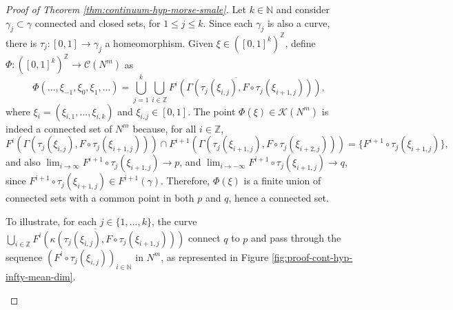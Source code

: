 \documentclass[sn-mathphys-num]{sn-jnl}%
\theoremstyle{thmstyleone}%
\theoremstyle{thmstyletwo}%
\theoremstyle{thmstylethree}%
\newcommand*\hyp[1]{\mathcal{#1}}
\begin{document}
\begin{proof}[Proof of Theorem \emph{\ref{thm:continuum-hyp-morse-smale}}]
    Let $k \in \mathbb{N}$ and consider $\gamma_j \subset \gamma$ connected and closed sets, for $1 \leq j \leq k$. Since each $\gamma_j$ is also a curve, there is $\tau_j: [0, 1] \to \gamma_j$ a homeomorphism. Given $\xi \in ([0, 1]^k)^{\mathbb{Z}}$, define $\Phi: ([0, 1]^k)^{\mathbb{Z}} \to \hyp{C}(N^m)$ as 
    \begin{equation*}
        \Phi(..., \xi_{-1}, \xi_0, \xi_1, ...) = \bigcup\limits_{j = 1}^k \overline{ \bigcup\limits_{i \in \mathbb{Z}}  F^i(\Gamma(\tau_j(\xi_{i, j}), F\circ\tau_j(\xi_{i + 1, j})))},
    \end{equation*}
    where $\xi_i = (\xi_{i, 1}, ..., \xi_{i, k})$ and $\xi_{i, j} \in [0, 1]$. The point $\Phi(\xi) \in \hyp{K}(N^m)$ is indeed a connected set of $N^m$ because, for all $i \in \mathbb{Z}$, 
    \begin{equation*}
        F^i(\Gamma(\tau_j(\xi_{i, j}), F\circ\tau_j(\xi_{i + 1, j}))) \cap F^{i + 1}(\Gamma(\tau_j(\xi_{i + 1, j}), F\circ\tau_j(\xi_{i + 2, j}))) = \{F^{i + 1}\circ\tau_j(\xi_{i + 1, j})\},
    \end{equation*}
    and also $\lim_{i \to \infty} F^{i + 1}\circ\tau_j(\xi_{i + 1, j}) \to p$, and $\lim_{i \to -\infty} F^{i + 1}\circ\tau_j(\xi_{i + 1, j}) \to q$, since $F^{i + 1}\circ\tau_j(\xi_{i + 1, j}) \in F^{i + 1}(\gamma)$. Therefore, $\Phi(\xi)$ is a finite union of connected sets with a common point in both $p$ and $q$, hence a connected set.

    
    To illustrate, for each $j \in \{1, ..., k\}$, the curve $\overline{ \bigcup\limits_{i \in \mathbb{Z}}  F^i(\kappa(\tau_j(\xi_{i, j}), F\circ\tau_j(\xi_{i + 1, j})))}$ connect $q$ to $p$ and pass through the sequence $(F^i\circ\tau_j(\xi_{i, j}))_{i \in \mathbb{N}}$ in $N^m$, as represented in Figure \ref{fig:proof-cont-hyp-infty-mean-dim}.

    \begin{figure}[ht]
        \centering
\end{figure}
\end{proof}
\end{document}
